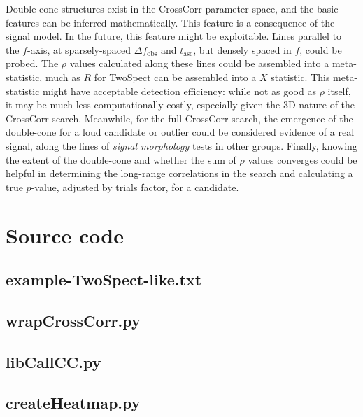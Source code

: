 \documentclass{article}
\begin{document}
Double-cone structures exist in the CrossCorr parameter space, and the basic features can be inferred mathematically.
This feature is a consequence of the signal model.
In the future, this feature might be exploitable.
Lines parallel to the $f$-axis, at sparsely-spaced $\Delta f_\mathrm{obs}$ and $t_\mathrm{asc}$, but densely spaced in $f$, could be probed.
The $\rho$ values calculated along these lines could be assembled into a meta-statistic, much as $R$ for TwoSpect can be assembled into a $X$ statistic.
This meta-statistic might have acceptable detection efficiency: while not as good as $\rho$ itself, it may be much less computationally-costly, especially given the 3D nature of the CrossCorr search.
Meanwhile, for the full CrossCorr search, the emergence of the double-cone for a loud candidate or outlier could be considered evidence of a real signal, along the lines of \textit{signal morphology} tests in other groups.
Finally, knowing the extent of the double-cone and whether the sum of $\rho$ values converges could be helpful in determining the long-range correlations in the search and calculating a true $p$-value, adjusted by trials factor, for a candidate.


\newpage

\appendix
\section{Source code}
\label{source_code_appendix}

\subsection{example-TwoSpect-like.txt}

\subsection{wrapCrossCorr.py}

\subsection{libCallCC.py}

\subsection{createHeatmap.py}

\end{document}
